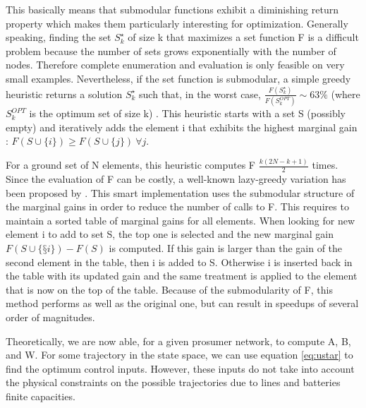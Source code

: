 \documentclass[conference]{IEEEtran}
\begin{document}

This basically means that submodular functions exhibit a diminishing return property which makes them particularly interesting for optimization. Generally speaking, finding the set $ S_k^{\star} $ of size k that maximizes a set function F is a difficult problem because the number of sets grows exponentially with the number of nodes. Therefore complete enumeration and evaluation is only feasible on very small examples. Nevertheless, if the set function is submodular, a simple greedy heuristic returns a solution $ S_k^{\star} $ such that, in the worst case, $ \frac{F(S_k^{\star})}{F(S_k^{OPT})} \sim 63\%$ (where $ S_k^{OPT}$ is the optimum set of size k) \cite{Krause2014}. This heuristic starts with a set S (possibly empty) and iteratively adds the element i that exhibits the highest marginal gain : $ F(S \cup \{i\}) \geq F(S \cup \{j\})\ \forall j $.

For a ground set of N elements, this heuristic computes F $ \frac{k(2 N - k + 1)}{2} $ times. Since the evaluation of F can be costly, a well-known lazy-greedy variation has been proposed by \cite{Minoux}. This smart implementation uses the submodular structure of the marginal gains in order to reduce the number of calls to F. This requires to maintain a sorted table of marginal gains for all elements. When looking for new element i to add to set S, the top one is selected and the new marginal gain $F(S\cup \{§i\}) - F(S)$ is computed. If this gain is larger than the  gain of the second element in the table, then i is added to S. Otherwise i is inserted back in the table with its updated gain and the same treatment is applied to the element that is now on the top of the table. Because of the submodularity of F, this method performs as well as the original one, but can result in speedups of several order of magnitudes.

Theoretically, we are now able, for a given prosumer network, to compute A, B, and W. For some trajectory in the state space, we can use equation \ref{eq:ustar} to find the optimum control inputs. However, these inputs do not take into account the physical constraints on the possible trajectories due to lines and batteries finite capacities.
\end{document}
